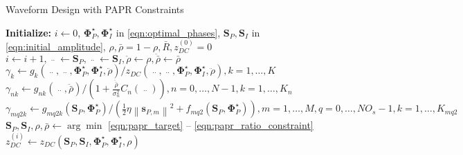 \begin{algorithm}
  \caption{Waveform Design with PAPR Constraints}
  \label{alg:papr}
  \begin{algorithmic}[1]
    \State \textbf{Initialize:} $i \leftarrow 0$, ${\mathbf{\Phi }}_P^ \star ,{\mathbf{\Phi }}_I^ \star $ in \ref{eqn:optimal_phases}, ${{{\mathbf{S}}_P},{{\mathbf{S}}_I}}$ in \ref{eqn:initial_amplitude}, $\rho ,\bar \rho  = 1 - \rho ,\bar R,z_{DC}^{(0)} = 0$
    \Repeat
      \State $i \leftarrow i + 1,\mathop {{{\mathbf{S}}_P}}\limits^{..}  \leftarrow {{\mathbf{S}}_P},\mathop {{{\mathbf{S}}_P}}\limits^{..}  \leftarrow {{\mathbf{S}}_I},\ddot \rho  \leftarrow \rho ,\ddot \bar \rho  \leftarrow \bar \rho $
      \State ${\gamma _k} \leftarrow {g_k}\left( {\mathop {{{\mathbf{S}}_P}}\limits^{..} ,\mathop {{{\mathbf{S}}_I}}\limits^{..} ,{\mathbf{\Phi }}_P^ \star ,{\mathbf{\Phi }}_I^ \star ,\ddot \rho } \right)/{z_{DC}}\left( {\mathop {{{\mathbf{S}}_P}}\limits^{..} ,\mathop {{{\mathbf{S}}_I}}\limits^{..} ,{\mathbf{\Phi }}_P^ \star ,{\mathbf{\Phi }}_I^ \star ,\ddot \rho } \right),k = 1, \ldots ,K$
      \State ${\gamma _{nk}} \leftarrow {g_{nk}}\left( {\mathop {{{\mathbf{S}}_I}}\limits^{..} ,\ddot \bar \rho } \right)/\left( {1 + \frac{{\ddot \bar \rho }}{{\sigma _n^2}}{C_n}\left( {\mathop {{{\mathbf{S}}_I}}\limits^{..} } \right)} \right),n = 0, \ldots ,N - 1,k = 1, \ldots ,{K_n}$
      \State ${\gamma _{mq2k}} \leftarrow {g_{mq2k}}\left( {{{\mathbf{S}}_P},{\mathbf{\Phi }}_P^ \star } \right)/\left( {\frac{1}{2}\eta {{\left\| {{{\mathbf{s}}_{P,m}}} \right\|}^2} + {f_{mq2}}\left( {{{\mathbf{S}}_P},{\mathbf{\Phi }}_P^ \star } \right)} \right),m = 1, \ldots ,M,q = 0, \ldots ,N{O_s} - 1,k = 1, \ldots ,{K_{mq2}}$
      \State ${{\mathbf{S}}_P},{{\mathbf{S}}_I},\rho ,\bar \rho  \leftarrow \arg \min $ \ref{eqn:papr_target} -- \ref{eqn:papr_ratio_constraint}
      \State $z_{DC}^{(i)} \leftarrow {z_{DC}}\left( {{{\mathbf{S}}_P},{{\mathbf{S}}_I},{\mathbf{\Phi }}_P^ \star ,{\mathbf{\Phi }}_I^ \star ,\rho } \right)$
  \end{algorithmic}
\end{algorithm} 